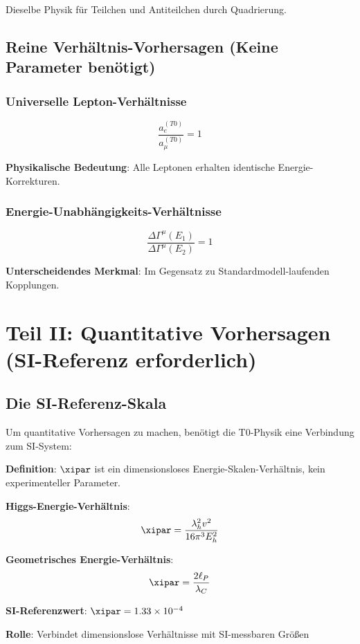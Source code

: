 	Dieselbe Physik für Teilchen und Antiteilchen durch Quadrierung.
	
	\subsection{Reine Verhältnis-Vorhersagen (Keine Parameter benötigt)}
	
	\subsubsection{Universelle Lepton-Verhältnisse}
	
	\begin{equation}
		\boxed{\frac{a_e^{(T0)}}{a_{\mu}^{(T0)}} = 1}
		\label{eq:universal_lepton_ratio}
	\end{equation}
	
	\textbf{Physikalische Bedeutung}: Alle Leptonen erhalten identische Energie-Korrekturen.
	
	\subsubsection{Energie-Unabhängigkeits-Verhältnisse}
	
	\begin{equation}
		\boxed{\frac{\Delta\Gamma^{\mu}(E_1)}{\Delta\Gamma^{\mu}(E_2)} = 1}
		\label{eq:energy_independence_ratio}
	\end{equation}
	
	\textbf{Unterscheidendes Merkmal}: Im Gegensatz zu Standardmodell-laufenden Kopplungen.

	\section{Teil II: Quantitative Vorhersagen (SI-Referenz erforderlich)}
	
	\subsection{Die SI-Referenz-Skala}
	
	Um quantitative Vorhersagen zu machen, benötigt die T0-Physik eine Verbindung zum SI-System:
	
	\begin{tcolorbox}[colback=green!5!white,colframe=green!75!black,title=SI-Referenz-Skala (Kein Parameter!)]
		\textbf{Definition}: $\xipar$ ist ein dimensionsloses Energie-Skalen-Verhältnis, kein experimenteller Parameter.
		
		\textbf{Higgs-Energie-Verhältnis}:
		\begin{equation}
			\xipar = \frac{\lambda_h^2 v^2}{16\pi^3 E_h^2}
		\end{equation}
		
		\textbf{Geometrisches Energie-Verhältnis}:
		\begin{equation}
			\xipar = \frac{2\ell_P}{\lambda_C}
		\end{equation}
		
		\textbf{SI-Referenzwert}: $\xipar = 1.33 \times 10^{-4}$
		
		\textbf{Rolle}: Verbindet dimensionslose Verhältnisse mit SI-messbaren Größen
	\end{tcolorbox}
	
